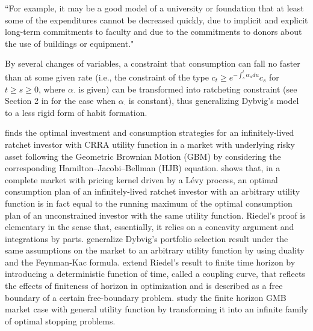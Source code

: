 \documentclass[11pt, oneside]{article}   	%
\theoremstyle{plain}
\theoremstyle{definition}
\theoremstyle{remark}
\begin{document}
{\footnotesize
\begin{displayquote}
``For example, it may be a good model of a university or foundation that at least some of the expenditures cannot be decreased quickly, due to implicit and explicit long-term commitments to faculty and due to the commitments to donors about the use of buildings or equipment."

\hfill\citet[p. 288]{dybvig}
\end{displayquote}}
By several changes of variables, a constraint that consumption can fall no faster than at some given rate (i.e., the constraint of the type $c_t\geq e^{-\int_s^t\alpha_udu}c_s$ for $t\geq s\geq 0$, where $\alpha_\cdot$ is given) can be transformed into ratcheting constraint (see Section 2 in \cite{dybvig} for the case when $\alpha_\cdot$ is constant), thus generalizing Dybvig's model to a less rigid form of habit formation.

\cite{dybvig} finds the optimal investment and consumption strategies for an infinitely-lived ratchet investor with CRRA utility function in a market with underlying risky asset following the Geometric Brownian Motion (GBM) by considering the corresponding Hamilton--Jacobi--Bellman (HJB) equation. \cite{riedel} shows that, in a complete market with pricing kernel driven by a L\'evy process, an optimal consumption plan of an infinitely-lived ratchet investor with an arbitrary utility function is in fact equal to the running maximum of the optimal consumption plan of an unconstrained investor with the same utility function. Riedel's proof is elementary in the sense that, essentially, it relies on a concavity argument and integrations by parts. \cite{Koo:2012aa} generalize Dybvig's portfolio selection result under the same assumptions on the market to an arbitrary utility function by using duality and the Feynman-Kac formula. \cite{Watson-Scott} extend Riedel's result to finite time horizon by introducing a deterministic function of time, called a coupling curve, that reflects the effects of finiteness of horizon in optimization and is described as a free boundary of a certain free-boundary problem. \cite{Jeon-Koo-Shin2018} study the finite horizon GMB market case with general utility function by transforming it into an infinite family of optimal stopping problems.
\end{document}
